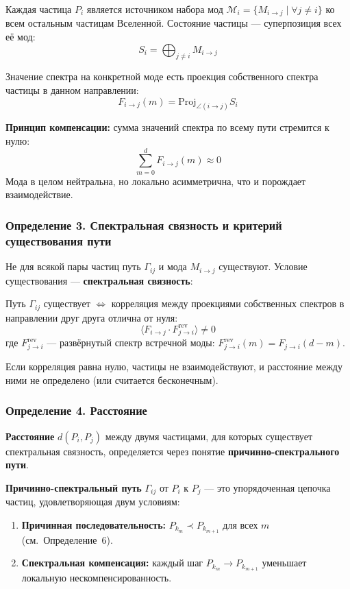 \documentclass[12pt,a4paper]{article}
\begin{document}
Каждая частица $P_i$ является источником набора мод $\mathcal{M}_i = \{M_{i \to j} \mid \forall j \neq i\}$ ко всем остальным частицам Вселенной. Состояние частицы --- суперпозиция всех её мод:
\begin{equation}
    S_i = \bigoplus_{j \neq i} M_{i \to j}
\end{equation}

Значение спектра на конкретной моде есть проекция собственного спектра частицы в данном направлении:
\begin{equation}
    F_{i \to j}(m) = \text{Proj}_{\angle(i \to j)} S_i
\end{equation}

\textbf{Принцип компенсации:} сумма значений спектра по всему пути стремится к нулю:
\begin{equation}
    \sum_{m=0}^{d} F_{i \to j}(m) \approx 0
\end{equation}
Мода в целом нейтральна, но локально асимметрична, что и порождает взаимодействие.

\subsubsection{Определение 3. Спектральная связность и критерий существования пути}
Не для всякой пары частиц путь $\Gamma_{ij}$ и мода $M_{i \to j}$ существуют. Условие существования --- \textbf{спектральная связность}:

Путь $\Gamma_{ij}$ существует $\iff$ корреляция между проекциями собственных спектров в направлении друг друга отлична от нуля:
\begin{equation}
    \langle F_{i \to j} \cdot F_{j \to i}^{\text{rev}} \rangle \neq 0
\end{equation}
где $F_{j \to i}^{\text{rev}}$ --- развёрнутый спектр встречной моды: $F_{j \to i}^{\text{rev}}(m) = F_{j \to i}(d-m)$.

Если корреляция равна нулю, частицы не взаимодействуют, и расстояние между ними не определено (или считается бесконечным).

\subsubsection{Определение 4. Расстояние}
\textbf{Расстояние} $d(P_i, P_j)$ между двумя частицами, для которых существует спектральная связность, определяется через понятие \textbf{причинно-спектрального пути}.

\textbf{Причинно-спектральный путь} $\Gamma_{ij}$ от $P_i$ к $P_j$ --- это упорядоченная цепочка частиц, удовлетворяющая двум условиям:
\begin{enumerate}[label=(\arabic*)]
    \item \textbf{Причинная последовательность:} $P_{k_m} \prec P_{k_{m+1}}$ для всех $m$ (см.~Определение~6).
    \item \textbf{Спектральная компенсация:} каждый шаг $P_{k_m} \to P_{k_{m+1}}$ уменьшает локальную нескомпенсированность.
\end{enumerate}
\end{document}
